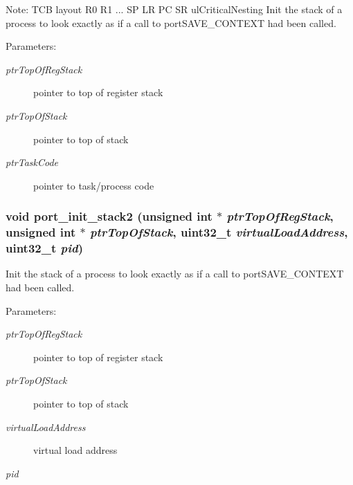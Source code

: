 \begin{Desc}
\item[Note:]TCB layout R0 R1 ... SP LR PC SR ulCriticalNesting Init the stack of a process to look exactly as if a call to portSAVE\_\-CONTEXT had been called. \end{Desc}
\begin{Desc}
\item[Parameters:]
\begin{description}
\item[{\em ptrTopOfRegStack}]pointer to top of register stack \item[{\em ptrTopOfStack}]pointer to top of stack \item[{\em ptrTaskCode}]pointer to task/process code \end{description}
\end{Desc}
\hypertarget{group___p_o_r_t_i_n_g_s_a_p7000_g0ee517fd2ee149554349f30d02f5c9b8}{
\subsubsection[{port\_\-init\_\-stack2}]{\setlength{\rightskip}{0pt plus 5cm}void port\_\-init\_\-stack2 (unsigned int $\ast$ {\em ptrTopOfRegStack}, \/  unsigned int $\ast$ {\em ptrTopOfStack}, \/  uint32\_\-t {\em virtualLoadAddress}, \/  uint32\_\-t {\em pid})}}
\label{group___p_o_r_t_i_n_g_s_a_p7000_g0ee517fd2ee149554349f30d02f5c9b8}


Init the stack of a process to look exactly as if a call to portSAVE\_\-CONTEXT had been called. \begin{Desc}
\item[Parameters:]
\begin{description}
\item[{\em ptrTopOfRegStack}]pointer to top of register stack \item[{\em ptrTopOfStack}]pointer to top of stack \item[{\em virtualLoadAddress}]virtual load address \item[{\em pid}]\end{description}
\end{Desc}
